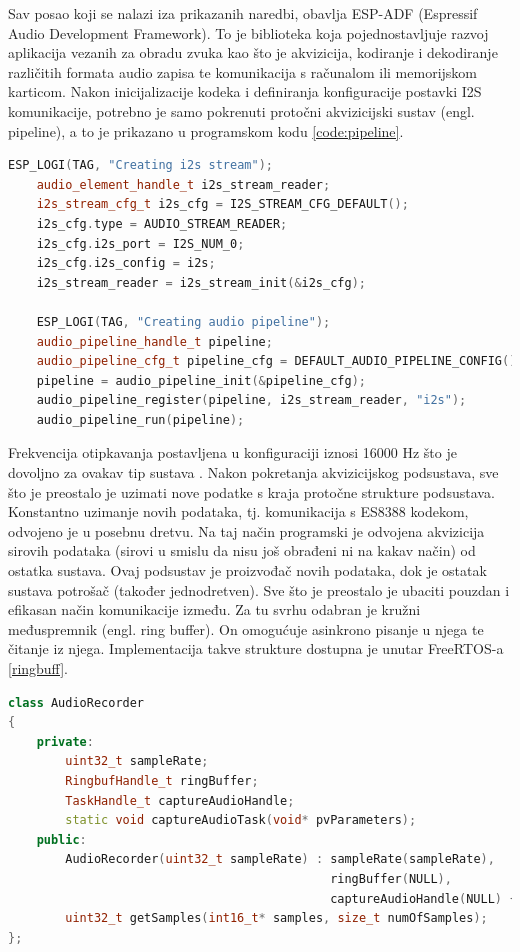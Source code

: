 Sav posao koji se nalazi iza prikazanih naredbi, obavlja ESP-ADF
(Espressif Audio Development Framework). To je biblioteka koja pojednostavljuje
razvoj aplikacija vezanih za obradu zvuka kao što je akvizicija, kodiranje i 
dekodiranje različitih formata audio zapisa te komunikacija s računalom ili 
memorijskom karticom.
Nakon inicijalizacije kodeka i definiranja konfiguracije postavki I2S komunikacije,
potrebno je samo pokrenuti protočni akvizicijski sustav (engl. pipeline), 
a to je prikazano u programskom kodu \ref{code:pipeline}.\\

\begin{lstlisting}[language=C++, caption=Pokretanje akvizicijskog sustava]
    ESP_LOGI(TAG, "Creating i2s stream");
    audio_element_handle_t i2s_stream_reader;
    i2s_stream_cfg_t i2s_cfg = I2S_STREAM_CFG_DEFAULT();
    i2s_cfg.type = AUDIO_STREAM_READER;
    i2s_cfg.i2s_port = I2S_NUM_0;
    i2s_cfg.i2s_config = i2s;
    i2s_stream_reader = i2s_stream_init(&i2s_cfg);

    ESP_LOGI(TAG, "Creating audio pipeline");
    audio_pipeline_handle_t pipeline;
    audio_pipeline_cfg_t pipeline_cfg = DEFAULT_AUDIO_PIPELINE_CONFIG();
    pipeline = audio_pipeline_init(&pipeline_cfg);
    audio_pipeline_register(pipeline, i2s_stream_reader, "i2s");
    audio_pipeline_run(pipeline);
\end{lstlisting}
\label{code:pipeline}

Frekvencija otipkavanja postavljena u konfiguraciji iznosi 16000 Hz što
je dovoljno za ovakav tip sustava \cite{wardentinyml}.
Nakon pokretanja akvizicijskog podsustava, sve što je preostalo je uzimati nove
podatke s kraja protočne strukture podsustava. Konstantno uzimanje novih podataka, tj. komunikacija
s ES8388 kodekom, odvojeno je u posebnu dretvu. Na taj način programski je 
odvojena akvizicija sirovih podataka (sirovi u smislu da nisu još obrađeni ni
na kakav način) od ostatka sustava. Ovaj podsustav je proizvođač novih podataka,
dok je ostatak sustava potrošač (također jednodretven). Sve što je preostalo je
ubaciti pouzdan i efikasan način komunikacije između. Za tu svrhu odabran je
kružni međuspremnik (engl. ring buffer). On omogućuje asinkrono pisanje u njega
te čitanje iz njega. Implementacija takve strukture dostupna je unutar FreeRTOS-a 
\ref{ringbuff}. 


\begin{lstlisting}[language=C++, caption=Razred AudioRecorder]
class AudioRecorder
{
    private:
        uint32_t sampleRate;
        RingbufHandle_t ringBuffer;
        TaskHandle_t captureAudioHandle;
        static void captureAudioTask(void* pvParameters);
    public:
        AudioRecorder(uint32_t sampleRate) : sampleRate(sampleRate), 
                                             ringBuffer(NULL), 
                                             captureAudioHandle(NULL) {}
        uint32_t getSamples(int16_t* samples, size_t numOfSamples);
};
\end{lstlisting}
\label{code:AudioRecorder}

